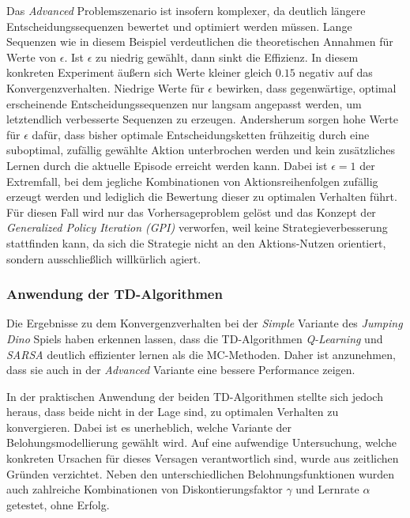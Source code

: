 Das \textit{Advanced} Problemszenario ist insofern komplexer, da deutlich längere Entscheidungssequenzen bewertet und optimiert werden müssen. Lange Sequenzen wie in diesem Beispiel verdeutlichen die theoretischen Annahmen für Werte von $\epsilon$. Ist $\epsilon$ zu niedrig gewählt, dann sinkt die Effizienz. In diesem konkreten Experiment äußern sich Werte kleiner gleich $0.15$ negativ auf das Konvergenzverhalten. Niedrige Werte für $\epsilon$ bewirken, dass gegenwärtige, optimal erscheinende Entscheidungssequenzen nur langsam angepasst werden, um letztendlich verbesserte Sequenzen zu erzeugen. Andersherum sorgen hohe Werte für $\epsilon$ dafür, dass bisher optimale Entscheidungsketten frühzeitig durch eine suboptimal, zufällig gewählte Aktion unterbrochen werden und kein zusätzliches Lernen durch die aktuelle Episode erreicht werden kann. Dabei ist $\epsilon = 1$ der Extremfall, bei dem jegliche Kombinationen von Aktionsreihenfolgen zufällig erzeugt werden und lediglich die Bewertung dieser zu optimalen Verhalten führt. Für diesen Fall wird nur das Vorhersageproblem gelöst und das Konzept der \textit{Generalized Policy Iteration (GPI)} verworfen, weil keine Strategieverbesserung stattfinden kann, da sich die Strategie nicht an den Aktions-Nutzen orientiert, sondern ausschließlich willkürlich agiert.

\subsubsection*{Anwendung der TD-Algorithmen}
Die Ergebnisse zu dem Konvergenzverhalten bei der \textit{Simple} Variante des \textit{Jumping Dino} Spiels haben erkennen lassen, dass die TD-Algorithmen \textit{Q-Learning} und \textit{SARSA} deutlich effizienter lernen als die MC-Methoden. Daher ist anzunehmen, dass sie auch in der \textit{Advanced} Variante eine bessere Performance zeigen.
\par 
In der praktischen Anwendung der beiden TD-Algorithmen stellte sich jedoch heraus, dass beide nicht in der Lage sind, zu optimalen Verhalten zu konvergieren. Dabei ist es unerheblich, welche Variante der Belohungsmodellierung gewählt wird. Auf eine aufwendige  Untersuchung, welche konkreten Ursachen für dieses Versagen verantwortlich sind, wurde aus zeitlichen Gründen verzichtet. Neben den unterschiedlichen Belohnungsfunktionen wurden auch zahlreiche Kombinationen von Diskontierungsfaktor $\gamma$ und Lernrate $\alpha$ getestet, ohne Erfolg.
\par 

